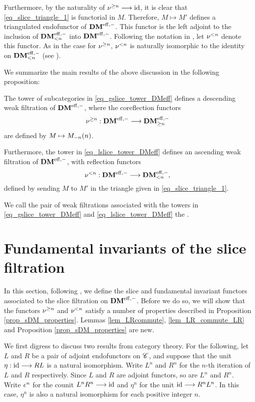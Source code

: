 Furthermore, by the naturality of $\sgDM{n} \to \id$, it is clear 
that \eqref{eq_slice_triangle_1} is functorial in $M$. Therefore,
$M \mapsto M'$ defines a triangulated endofunctor of $\DMeff$.
This functor is the left adjoint to the inclusion of 
$\LFiltDM[n]{\DMeff}$ into $\DMeff$. Following the notation in 
\cite{HuKa}, let $\slDM{n}$ denote this functor. As in the case 
for $\sgDM{n}$, $\slDM{n}$ is naturally isomorphic to the identity 
on $\LFiltDM[n]{\DMeff}$ (see \cite[1.4i, ii]{HuKa}). 

We summarize the main results of the above discussion in the 
following proposition:

\begin{prop}\label{prop_slice_DMeff}
The tower of subcategories in \eqref{eq_gslice_tower_DMeff} 
defines a descending weak filtration of $\DMeff$, where the
coreflection functors
\[
\sgDM{n}: \DMeff \to \GFiltDM[n]{\DMeff}
\] 
are defined by $M \mapsto \tZ[n]{\hZ[n]{M}}$.

Furthermore, the tower in \eqref{eq_lslice_tower_DMeff}
defines an ascending weak filtration of $\DMeff$, with
reflection functors 
\[
\slDM{n}: \DMeff \to \LFiltDM[n]{\DMeff},
\]
defined by sending $M$ to $M'$ in the triangle given in 
\eqref{eq_slice_triangle_1}.
\end{prop}

We call the pair of weak filtrations associated with the
towers in \eqref{eq_gslice_tower_DMeff} and 
\eqref{eq_lslice_tower_DMeff} the .

\section{Fundamental invariants of the slice filtration}

In this section, following \cite[1.4 (iv, v)]{HuKa}, we define
the slice and fundamental invariant functors associated to the
slice filtration on $\DMeff$. Before we do so, we will show that 
the functors $\sgDM{n}$ and $\slDM{n}$ satisfy a number of 
properties described in Proposition \ref{prop_sDM_properties}.
Lemmas \ref{lem_LRcommute}, \ref{lem_LR_commute_LR} and 
Proposition \ref{prop_sDM_properties} are new.

We first digress to discuss two results from category theory.
For the following, let $L$ and $R$ be a pair of adjoint 
endofunctors on $\Cat{C}$, and suppose that the unit $\eta : \id 
\to RL$ is a natural isomorphism. Write $L^n$ and $R^n$ for the 
$n$-th iteration of $L$ and $R$ respectively. Since $L$ and $R$ 
are adjoint functors, so are $L^n$ and $R^n$. Write $\cuHI^n$ for 
the counit $L^n R^n \to \id$ and $\eta^n$ for the unit $\id \to 
R^n L^n$. In this case, $\eta^n$ is also a natural isomorphism for 
each positive integer $n$. 

